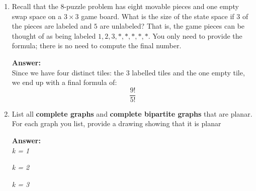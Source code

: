 \documentclass[a4paper,12pt]{article}
\begin{document}
\begin{enumerate}
\item
Recall that the 8-puzzle problem has eight movable pieces and one empty swap space on a $3 \times 3$ game board. What is the size of the state space if $3$ of the pieces are labeled and $5$ are unlabeled? That is, the game pieces can be thought of as being labeled $1, 2, 3,\ast,\ast,\ast,\ast, \ast $. You only need to provide the formula; there is no need to compute the final number. 

	\subitem \textbf{Answer:}\\
	Since we have four distinct tiles: the $3$ labelled tiles and the one empty tile, we end up with a final formula of:
	$$ \frac{9!}{5!} $$
	
\item
List all \textbf{complete graphs} and \textbf{complete bipartite graphs} that are planar. For each graph you list, provide a drawing showing that it is planar

	\textbf{Answer:}\\
		 \textit{k = 1}
		\begin{center}
		\end{center}

		 \textit{k = 2}
		\begin{center}
		\end{center}

		 \textit{k = 3}
		\begin{center}
		\end{center}
	

\end{enumerate}
\end{document}
